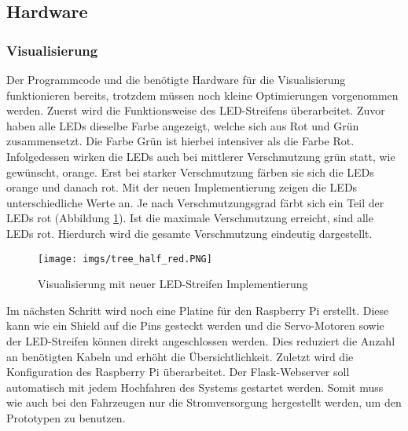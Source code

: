 \documentclass[.../Dokumentation.tex]{subfiles}
\begin{document}
    \subsection{Hardware}\label{sec-ita4-hardware}
        \subsubsection*{Visualisierung}
    Der Programmcode und die benötigte Hardware für die Visualisierung funktionieren bereits, trotzdem müssen noch kleine Optimierungen vorgenommen werden. Zuerst wird die Funktionsweise des LED-Streifens überarbeitet. Zuvor haben alle LEDs dieselbe Farbe angezeigt, welche sich aus Rot und Grün zusammensetzt. Die Farbe Grün ist hierbei intensiver als die Farbe Rot. Infolgedessen wirken die LEDs auch bei mittlerer Verschmutzung grün statt, wie gewünscht, orange.
    Erst bei starker Verschmutzung färben sie sich die LEDs orange und danach rot. Mit der neuen Implementierung zeigen die LEDs unterschiedliche Werte an. Je nach Verschmutzungsgrad färbt sich ein Teil der LEDs rot (Abbildung \ref{fig-hardware-tree-half-ref}). Ist die maximale Verschmutzung erreicht, sind alle LEDs rot. Hierdurch wird die gesamte Verschmutzung eindeutig dargestellt.
    \begin{figure}[H]
    	\begin{center}
    		\texttt{[image: imgs/tree\_half\_red.PNG]}
    		\caption{Visualisierung mit neuer LED-Streifen Implementierung}
    		\label{fig-hardware-tree-half-ref}
    	\end{center}
    \end{figure}
	\noindent
    Im nächsten Schritt wird noch eine Platine für den Raspberry Pi erstellt. Diese kann wie ein Shield auf die Pins gesteckt werden und die Servo-Motoren sowie der LED-Streifen können direkt angeschlossen werden. Dies reduziert die Anzahl an benötigten Kabeln und erhöht die Übersichtlichkeit. Zuletzt wird die Konfiguration des Raspberry Pi überarbeitet. Der Flask-Webserver soll automatisch mit jedem Hochfahren des Systems gestartet werden. Somit muss wie auch bei den Fahrzeugen nur die Stromversorgung hergestellt werden, um den Prototypen zu benutzen.
        
\end{document}

